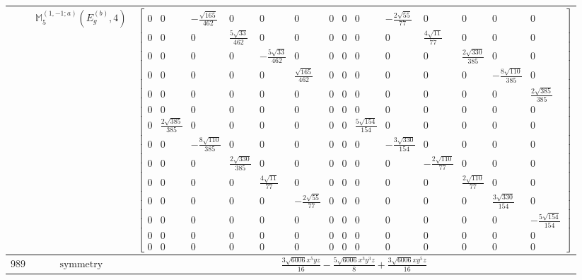 \documentclass[fleqn,8pt,landscape]{jsarticle}
\begin{document}
\begin{longtable}{ccc}
$  $ & $ \mathbb{M}_{5}^{(1,-1;a)}(E_{g}^{(b)},4) $ & $ \begin{bmatrix} 0 & 0 & - \frac{\sqrt{165}}{462} & 0 & 0 & 0 & 0 & 0 & 0 & - \frac{2 \sqrt{55}}{77} & 0 & 0 & 0 & 0 \\ 0 & 0 & 0 & \frac{5 \sqrt{33}}{462} & 0 & 0 & 0 & 0 & 0 & 0 & \frac{4 \sqrt{11}}{77} & 0 & 0 & 0 \\ 0 & 0 & 0 & 0 & - \frac{5 \sqrt{33}}{462} & 0 & 0 & 0 & 0 & 0 & 0 & \frac{2 \sqrt{330}}{385} & 0 & 0 \\ 0 & 0 & 0 & 0 & 0 & \frac{\sqrt{165}}{462} & 0 & 0 & 0 & 0 & 0 & 0 & - \frac{8 \sqrt{110}}{385} & 0 \\ 0 & 0 & 0 & 0 & 0 & 0 & 0 & 0 & 0 & 0 & 0 & 0 & 0 & \frac{2 \sqrt{385}}{385} \\ 0 & 0 & 0 & 0 & 0 & 0 & 0 & 0 & 0 & 0 & 0 & 0 & 0 & 0 \\ 0 & \frac{2 \sqrt{385}}{385} & 0 & 0 & 0 & 0 & 0 & 0 & \frac{5 \sqrt{154}}{154} & 0 & 0 & 0 & 0 & 0 \\ 0 & 0 & - \frac{8 \sqrt{110}}{385} & 0 & 0 & 0 & 0 & 0 & 0 & - \frac{3 \sqrt{330}}{154} & 0 & 0 & 0 & 0 \\ 0 & 0 & 0 & \frac{2 \sqrt{330}}{385} & 0 & 0 & 0 & 0 & 0 & 0 & - \frac{2 \sqrt{110}}{77} & 0 & 0 & 0 \\ 0 & 0 & 0 & 0 & \frac{4 \sqrt{11}}{77} & 0 & 0 & 0 & 0 & 0 & 0 & \frac{2 \sqrt{110}}{77} & 0 & 0 \\ 0 & 0 & 0 & 0 & 0 & - \frac{2 \sqrt{55}}{77} & 0 & 0 & 0 & 0 & 0 & 0 & \frac{3 \sqrt{330}}{154} & 0 \\ 0 & 0 & 0 & 0 & 0 & 0 & 0 & 0 & 0 & 0 & 0 & 0 & 0 & - \frac{5 \sqrt{154}}{154} \\ 0 & 0 & 0 & 0 & 0 & 0 & 0 & 0 & 0 & 0 & 0 & 0 & 0 & 0 \\ 0 & 0 & 0 & 0 & 0 & 0 & 0 & 0 & 0 & 0 & 0 & 0 & 0 & 0 \end{bmatrix} $ \\ \hline
$ 989 $ & $ \text{symmetry} $ & $ \frac{3 \sqrt{6006} x^{5} y z}{16} - \frac{5 \sqrt{6006} x^{3} y^{3} z}{8} + \frac{3 \sqrt{6006} x y^{5} z}{16} $ \\

\end{longtable}
\end{document}
